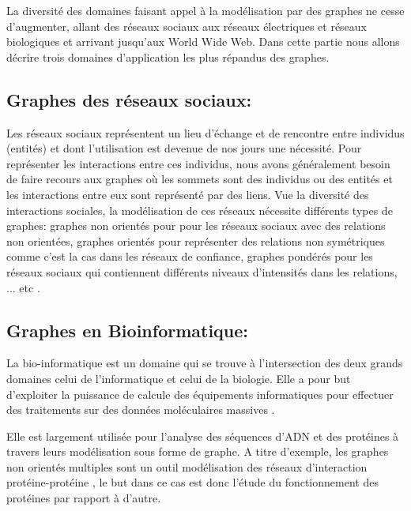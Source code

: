 
	La diversité des domaines faisant appel à la modélisation par des graphes ne cesse d'augmenter, allant des réseaux sociaux aux réseaux électriques et réseaux biologiques et arrivant jusqu'aux World Wide Web. Dans cette partie nous allons décrire trois domaines d'application les plus répandus des graphes.
	
		\subsection{Graphes des réseaux sociaux:}
		Les réseaux sociaux représentent un lieu d'échange et de rencontre entre individus (entités) et dont l'utilisation est devenue de nos jours une nécessité.  
		Pour représenter les interactions entre ces individus, nous avons généralement besoin de faire recours aux graphes où les sommets sont des individus ou des entités et les interactions entre eux sont représenté par des liens. 
		Vue la diversité des interactions sociales, la modélisation de ces réseaux  nécessite différents types de graphes: graphes non orientés pour pour les réseaux sociaux avec des relations non
orientées, graphes orientés pour représenter des relations non symétriques
comme c'est la cas dans les réseaux de confiance, graphes pondérés pour les réseaux sociaux qui contiennent différents niveaux d'intensités dans les relations, ... etc \citep{lemmouchi2012etude}.
		
		\subsection{Graphes en Bioinformatique:}
		
		La bio-informatique est un domaine qui se trouve à l'intersection des deux grands domaines celui de l'informatique et celui de la biologie. Elle a pour but d'exploiter la puissance de calcule des équipements informatiques pour effectuer des traitements sur des données moléculaires massives \citep{pellegrini2004protein}.
		
		Elle est largement utilisée pour l’analyse des séquences d’ADN et des protéines à travers leurs modélisation sous forme de graphe. A titre d'exemple, les graphes non orientés multiples sont un outil modélisation des réseaux d’interaction protéine-protéine \citep{pellegrini2004protein}, 
		le but dans ce cas est donc l'étude du fonctionnement des protéines par rapport à d'autre.
		
